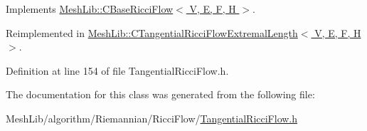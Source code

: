 Implements \hyperlink{class_mesh_lib_1_1_c_base_ricci_flow_a0c8e62c086e434c38820ceec5592884e}{Mesh\+Lib\+::\+C\+Base\+Ricci\+Flow$<$ V, E, F, H $>$}.



Reimplemented in \hyperlink{class_mesh_lib_1_1_c_tangential_ricci_flow_extremal_length_a2a1ba73cdc13bd1778ecbf89d632f691}{Mesh\+Lib\+::\+C\+Tangential\+Ricci\+Flow\+Extremal\+Length$<$ V, E, F, H $>$}.



Definition at line 154 of file Tangential\+Ricci\+Flow.\+h.



The documentation for this class was generated from the following file\+:\begin{DoxyCompactItemize}
\item 
Mesh\+Lib/algorithm/\+Riemannian/\+Ricci\+Flow/\hyperlink{_tangential_ricci_flow_8h}{Tangential\+Ricci\+Flow.\+h}\end{DoxyCompactItemize}
